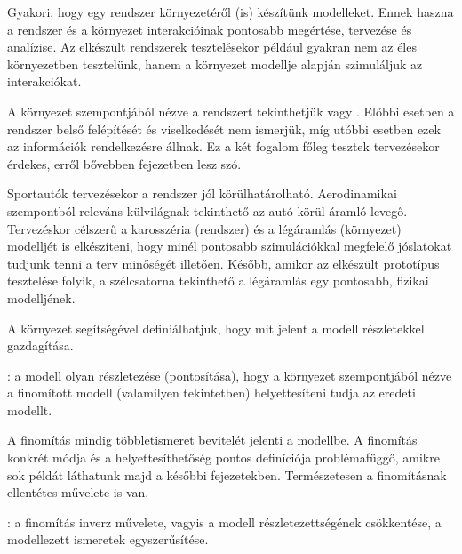 \begin{megjegyzes}
	Gyakori, hogy egy rendszer környezetéről (is) készítünk modelleket. Ennek haszna a rendszer és a környezet interakcióinak pontosabb megértése, tervezése és analízise. Az elkészült rendszerek tesztelésekor például gyakran nem az éles környezetben tesztelünk, hanem a környezet modellje alapján szimuláljuk az interakciókat.

	A környezet szempontjából nézve a rendszert tekinthetjük  vagy . Előbbi esetben a rendszer belső felépítését és viselkedését nem ismerjük, míg utóbbi esetben ezek az információk rendelkezésre állnak. Ez a két fogalom főleg tesztek tervezésekor érdekes, erről bővebben  fejezetben lesz szó.
\end{megjegyzes}

\begin{pelda}
	Sportautók tervezésekor a rendszer jól körülhatárolható. Aerodinamikai szempontból releváns külvilágnak tekinthető az autó körül áramló levegő. Tervezéskor célszerű a karosszéria (rendszer) és a légáramlás (környezet) modelljét is elkészíteni, hogy minél pontosabb szimulációkkal megfelelő jóslatokat tudjunk tenni a terv minőségét illetően. Később, amikor az elkészült prototípus tesztelése folyik, a szélcsatorna tekinthető a légáramlás egy pontosabb, fizikai modelljének.
\end{pelda}

A környezet segítségével definiálhatjuk, hogy mit jelent a modell részletekkel gazdagítása.

\begin{definicio}
	: a modell olyan részletezése (pontosítása), hogy a környezet szempontjából nézve a finomított modell (valamilyen tekintetben) helyettesíteni tudja az eredeti modellt.
\end{definicio}

A finomítás mindig többletismeret bevitelét jelenti a modellbe. A finomítás konkrét módja és a helyettesíthetőség pontos definíciója problémafüggő, amikre sok példát láthatunk majd a későbbi fejezetekben. Természetesen a finomításnak ellentétes művelete is van.

\begin{definicio}
	: a finomítás inverz művelete, vagyis a modell részletezettségének csökkentése, a modellezett ismeretek egyszerűsítése.
\end{definicio}


